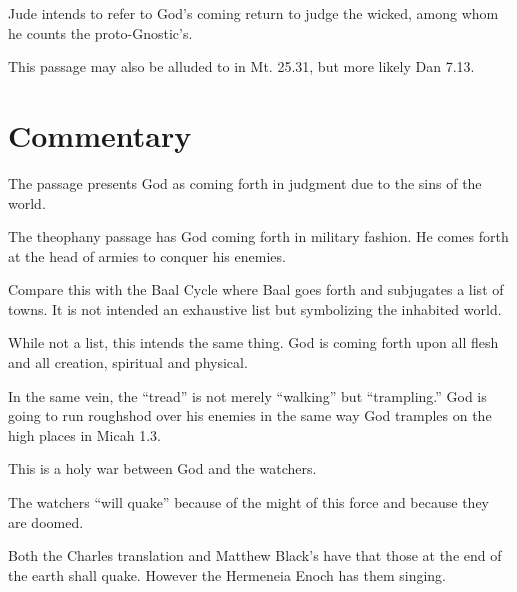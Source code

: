 \documentclass{beamer}
\begin{document}
\begin{frame}
  Jude intends to refer to God's coming return to judge the wicked, among whom he counts the proto-Gnostic's.
\end{frame}

\begin{frame}
  This passage may also be alluded to in Mt. 25.31, but more likely Dan 7.13.
\end{frame}

\section{Commentary}

\begin{frame}
  The passage presents God as coming forth in judgment due to the sins of the world.
\end{frame}

\begin{frame}
  The theophany passage has God coming forth in military fashion.
  He comes forth at the head of armies to conquer his enemies.
\end{frame}

\begin{frame}
  Compare this with the Baal Cycle where Baal goes forth and subjugates a list of towns.
  It is not intended an exhaustive list but symbolizing the inhabited world.
\end{frame}

\begin{frame}
  While not a list, this intends the same thing.
  God is coming forth upon all flesh and all creation, spiritual and physical.
\end{frame}

\begin{frame}
  In the same vein, the ``tread'' is not merely ``walking'' but ``trampling.''
  God is going to run roughshod over his enemies in the same way God tramples on the high places in Micah 1.3.
\end{frame}

\begin{frame}
  This is a holy war between God and the watchers.
\end{frame}

\begin{frame}
  The watchers ``will quake'' because of the might of this force and because they are doomed.
\end{frame}

\begin{frame}
  Both the Charles translation and Matthew Black's have that those at the end of the earth shall quake.
  However the Hermeneia Enoch has them singing.
\end{frame}
\end{document}
